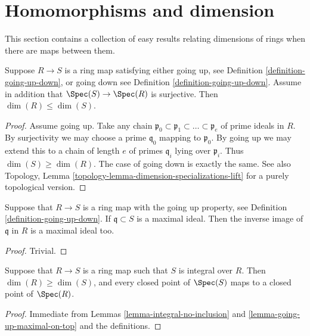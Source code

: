 \section{Homomorphisms and dimension}
\label{section-homomorphism-dimension}

\noindent
This section contains a collection of easy results relating
dimensions of rings when there are maps between them.

\begin{lemma}
\label{lemma-dimension-going-up}
Suppose $R \to S$ is a ring map satisfying either going up, see
Definition \ref{definition-going-up-down}, or going down
see Definition \ref{definition-going-up-down}.
Assume in addition that $\Spec(S) \to \Spec(R)$
is surjective. Then $\dim(R) \leq \dim(S)$.
\end{lemma}

\begin{proof}
Assume going up.
Take any chain $\mathfrak p_0 \subset \mathfrak p_1 \subset \ldots
\subset \mathfrak p_e$ of prime ideals in $R$.
By surjectivity we may choose a prime $\mathfrak q_0$ mapping
to $\mathfrak p_0$. By going up we may extend this to a chain
of length $e$ of primes $\mathfrak q_i$ lying over
$\mathfrak p_i$. Thus $\dim(S) \geq \dim(R)$.
The case of going down is exactly the same.
See also Topology, Lemma \ref{topology-lemma-dimension-specializations-lift}
for a purely topological version.
\end{proof}

\begin{lemma}
\label{lemma-going-up-maximal-on-top}
Suppose that $R \to S$ is a ring map with the going up property,
see Definition \ref{definition-going-up-down}. If
$\mathfrak q \subset S$ is a maximal ideal.
Then the inverse image of $\mathfrak q$ in $R$
is a maximal ideal too.
\end{lemma}

\begin{proof}
Trivial.
\end{proof}

\begin{lemma}
\label{lemma-integral-dim-up}
Suppose that $R \to S$ is a ring map such that $S$ is integral over $R$.
Then $\dim (R) \geq \dim(S)$, and every closed point of $\Spec(S)$
maps to a closed point of $\Spec(R)$.
\end{lemma}

\begin{proof}
Immediate from Lemmas \ref{lemma-integral-no-inclusion} and
\ref{lemma-going-up-maximal-on-top}
and the definitions.
\end{proof}


